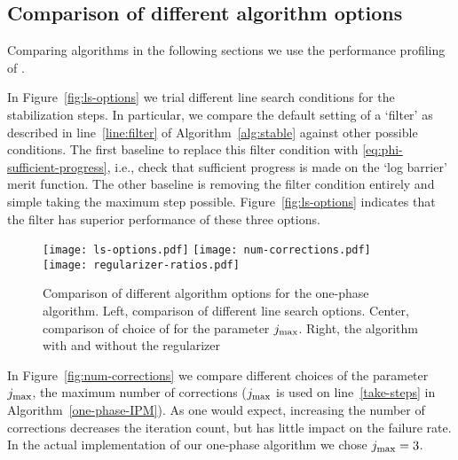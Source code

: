 \documentclass{article}
\begin{document}
\subsection{Comparison of different algorithm options}\label{alg:comparison-options}

Comparing algorithms in the following sections we use the performance profiling of \cite{dolan2002benchmarking}.



In Figure~\ref{fig:ls-options} we trial different line search conditions for the stabilization steps. In particular, we compare the default setting of a `filter' as described in line~\ref{line:filter} of Algorithm~\ref{alg:stable} against other possible conditions. The first baseline to replace this filter condition with  \eqref{eq:phi-sufficient-progress}, i.e., check that sufficient progress is made on the `log barrier' merit function. The other baseline is removing the filter condition entirely and simple taking the maximum step possible. Figure~\ref{fig:ls-options} indicates that the filter has superior performance of these three options.

\begin{figure}[H]
\texttt{[image: ls-options.pdf]}
\texttt{[image: num-corrections.pdf]}
\texttt{[image: regularizer-ratios.pdf]}
\caption{Comparison of different algorithm options for the one-phase algorithm. Left, comparison of different line search options. Center, comparison of choice of for the parameter $j_{\max}$. Right, the algorithm with and without the regularizer}
\label{fig:alg-options}
\end{figure}

In Figure~\ref{fig:num-corrections} we compare different choices of the parameter $j_{\max}$, the maximum number of corrections ($j_{\max}$ is used on line~\ref{take-steps} in Algorithm~\ref{one-phase-IPM}). As one would expect, increasing the number of corrections decreases the iteration count, but has little impact on the failure rate. In the actual implementation of our one-phase algorithm we chose $j_{\max}=3$.
\end{document}
